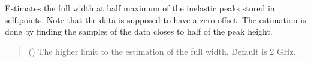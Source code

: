 \documentclass[letterpaper,10pt,english]{sphinxmanual}
\begin{document}
\begin{fulllineitems}
\begin{fulllineitems}
\label{\detokenize{source/_autosummary/HDF5_BLS_treat.Treat:HDF5_BLS_treat.Treat.estimate_width_inelastic_peaks}}
\pysigstartsignatures
\pysiglinewithargsret
{}
{}
{}
\pysigstopsignatures
\sphinxAtStartPar
Estimates the full width at half maximum of the inelastic peaks stored in self.points. Note that the data is supposed to have a zero offset. The estimation is done by finding the samples of the data closes to half of the peak height.
\begin{quote}\begin{description}
\sphinxAtStartPar
{} (\sphinxstyleliteralemphasis{\sphinxupquote{, }}) \textendash{} The higher limit to the estimation of the full width. Default is 2 GHz.

\end{description}\end{quote}

\end{fulllineitems}



\end{fulllineitems}
\end{document}

